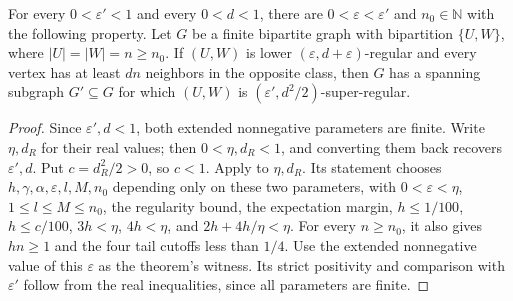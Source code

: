 \begin{lemma}
For every $0<\varepsilon'<1$ and every $0<d<1$, there are $0<\varepsilon<\varepsilon'$ and $n_0\in\mathbb N$ with the following property.  Let $G$ be a finite bipartite graph with bipartition $\{U,W\}$, where $|U|=|W|=n\geq n_0$.  If $(U,W)$ is lower $(\varepsilon,d+\varepsilon)$-regular and every vertex has at least $dn$ neighbors in the opposite class, then $G$ has a spanning subgraph $G'\subseteq G$ for which $(U,W)$ is $(\varepsilon',d^2/2)$-super-regular.
\end{lemma}
\begin{proof}
Since $\varepsilon',d<1$, both extended nonnegative parameters are
finite. Write $\eta,d_R$ for their real values; then
$0<\eta,d_R<1$, and converting them back recovers
$\varepsilon',d$. Put $c=d_R^2/2>0$, so $c<1$.
Apply  to $\eta,d_R$.
Its statement chooses $h,\gamma,\alpha,\varepsilon,l,M,n_0$
depending only on these two parameters, with
$0<\varepsilon<\eta$, $1\leq l\leq M\leq n_0$, the regularity
bound, the expectation margin, $h\leq1/100$, $h\leq c/100$,
$3h<\eta$, $4h<\eta$, and $2h+4h/\eta<\eta$.
For every $n\geq n_0$, it also gives $hn\geq1$ and the four
tail cutoffs less than $1/4$. Use the extended nonnegative value
of this $\varepsilon$ as the theorem's witness. Its strict
positivity and comparison with $\varepsilon'$ follow from the
real inequalities, since all parameters are finite.


\end{proof}
